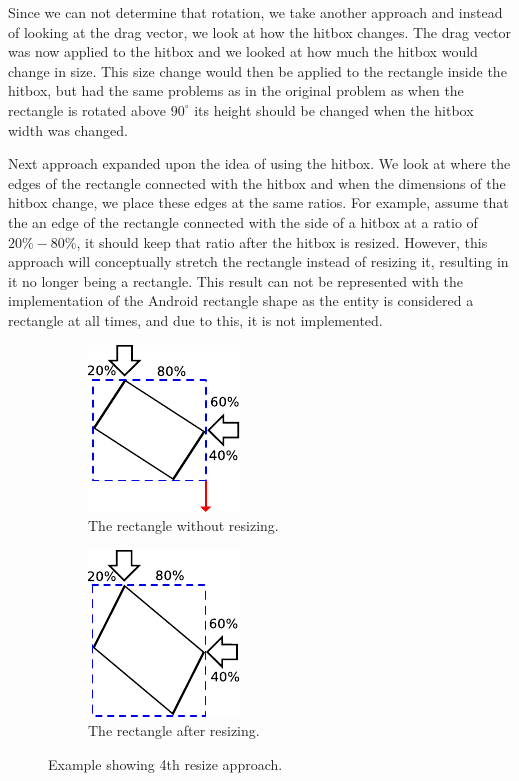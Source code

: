 Since we can not determine that rotation, we take another approach and instead of looking at the drag vector, we look at how the hitbox changes. 
The drag vector was now applied to the hitbox and we looked at how much the hitbox would change in size.
This size change would then be applied to the rectangle inside the hitbox, but had the same problems as in the original problem as when the rectangle is rotated above $90^\circ$ its height should be changed when the hitbox width was changed.

Next approach expanded upon the idea of using the hitbox. 
We look at where the edges of the rectangle connected with the hitbox and when the dimensions of the hitbox change, we place these edges at the same ratios.
For example, assume that the an edge of the rectangle connected with the side of a hitbox at a ratio of $20\% - 80\%$, it should keep that ratio after the hitbox is resized.
However, this approach will conceptually stretch the rectangle instead of resizing it, resulting in it no longer being a rectangle.
This result can not be represented with the implementation of the Android rectangle shape as the entity is considered a rectangle at all times, and due to this, it is not implemented.
\begin{figure}[h]
	\centering
	\begin{subfigure}[b]{0.45\textwidth}
		\centering
		\includegraphics[scale=1.4]{media/sprint3/scaling-no-stretching}
		\caption{The rectangle without resizing.}
		\label{figure:app4.1}
	\end{subfigure}
	\qquad
	\begin{subfigure}[b]{0.45\textwidth}
		\centering
			\includegraphics[scale=1.4]{media/sprint3/scaling-with-stretching}
			\caption{The rectangle after resizing.}
		\label{figure:app4.2}
	\end{subfigure}
	\caption{Example showing 4th resize approach.}
	\label{figure:app4}
\end{figure}
